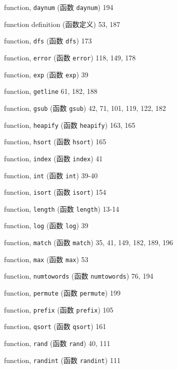 \begin{multicols}{3}
\hangindent=3pc  function, \verb'daynum' (函数 \verb'daynum') 194

\hangindent=3pc  function definition (函数定义) 53, 187

\hangindent=3pc  function, \verb'dfs' (函数 \verb'dfs') 173

\hangindent=3pc  function, \verb'error' (函数 \verb'error')
118, 149, 178

\hangindent=3pc  function, \verb'exp' (函数 \verb'exp') 39

\hangindent=3pc  function, \verb'getline' 61, 182, 188

\hangindent=3pc  function, \verb'gsub' (函数 \verb'gsub')
42, 71, 101, 119, 122, 182

\hangindent=3pc  function, \verb'heapify' (函数 \verb'heapify')
163, 165

\hangindent=3pc  function, \verb'hsort' (函数 \verb'hsort') 165

\hangindent=3pc  function, \verb'index' (函数 \verb'index') 41

\hangindent=3pc  function, \verb'int' (函数 \verb'int') 39-40

\hangindent=3pc  function, \verb'isort' (函数 \verb'isort') 154

\hangindent=3pc  function, \verb'length' (函数 \verb'length') 13-14

\hangindent=3pc  function, \verb'log' (函数 \verb'log') 39

\hangindent=3pc  function, \verb'match' (函数 \verb'match')
35, 41, 149, 182, 189, 196

\hangindent=3pc  function, \verb'max' (函数 \verb'max') 53

\hangindent=3pc  function, \verb'numtowords' (函数
\verb'numtowords') 76, 194

\hangindent=3pc  function, \verb'permute' (函数 \verb'permute') 199

\hangindent=3pc  function, \verb'prefix' (函数 \verb'prefix') 105

\hangindent=3pc  function, \verb'qsort' (函数 \verb'qsort') 161

\hangindent=3pc  function, \verb'rand' (函数 \verb'rand') 40, 111

\hangindent=3pc  function, \verb'randint' (函数 \verb'randint') 111


\end{multicols}
